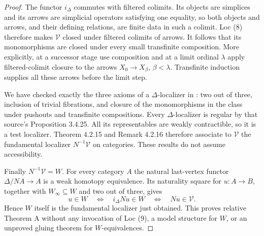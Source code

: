 \begin{proof}
The functor $i_\Delta$ commutes with filtered colimits. Its objects are simplices and its arrows are simplicial operators satisfying one equality, so both objects and arrows, and their defining relations, are finite data in such a colimit. Loc (8) therefore makes $\mathcal V$ closed under filtered colimits of arrows. It follows that its monomorphisms are closed under every small transfinite composition. More explicitly, at a successor stage use composition and at a limit ordinal $\lambda$ apply filtered-colimit closure to the arrows $X_0\to X_\beta$, $\beta<\lambda$. Transfinite induction supplies all these arrows before the limit step.

We have checked exactly the three axioms of a $\Delta$-localizer in \citet[Definition 1.4.1]{FGHCisinski2006}: two out of three, inclusion of trivial fibrations, and closure of the monomorphisms in the class under pushouts and transfinite compositions. Every $\Delta$-localizer is regular by that source's Proposition 3.4.25. All its representables are weakly contractible, so it is a test localizer. Theorem 4.2.15 and Remark 4.2.16 therefore associate to $\mathcal V$ the fundamental localizer $N^{-1}\mathcal V$ on categories. These results do not assume accessibility.

Finally $N^{-1}\mathcal V=W$. For every category $A$ the natural last-vertex functor $\Delta/NA\to A$ is a weak homotopy equivalence. Its naturality square for $u:A\to B$, together with $W_\infty\subseteq W$ and two out of three, gives
\[
 u\in W\quad\Longleftrightarrow\quad
 i_\Delta Nu\in W\quad\Longleftrightarrow\quad Nu\in\mathcal V.
\]
Hence $W$ itself is the fundamental localizer just obtained. This proves relative Theorem A without any invocation of Loc (9), a model structure for $W$, or an unproved gluing theorem for $W$-equivalences.
\end{proof}

